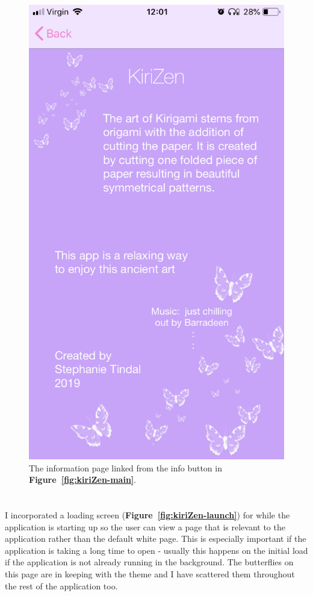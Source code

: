 \documentclass[11pt]{article}
\begin{document}
\begin{figure}[!ht]
\begin{minipage}{0.45\textwidth}
                            \includegraphics[width=0.7\linewidth]{KiriZen/info.png}
                            \caption{The information page linked from the info button in \textbf{Figure~\ref{fig:kiriZen-main}}.\\\\}
                            \label{fig:kiriZen-info}
                        \end{minipage}
                    \end{figure}
                    
                    \paragraph{}
                    I incorporated a loading screen (\textbf{Figure~\ref{fig:kiriZen-launch}}) for while the application is starting up so the user can view a page that is relevant to the application rather than the default white page. This is especially important if the application is taking a long time to open - usually this happens on the initial load if the application is not already running in the background. The butterflies on this page are in keeping with the theme and I have scattered them throughout the rest of the application too.
                    
\end{document}
